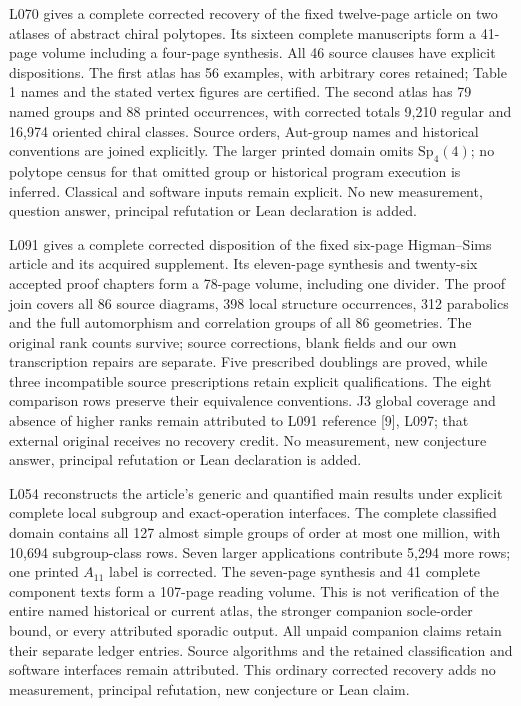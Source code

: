 \documentclass[11pt,a4paper]{article}
\begin{document}
L070 gives a complete corrected recovery of the fixed twelve-page article
on two atlases of abstract chiral polytopes. Its sixteen complete manuscripts
form a 41-page volume including a four-page synthesis. All 46 source clauses
have explicit dispositions. The first atlas has 56 examples, with arbitrary
cores retained; Table 1 names and the stated vertex figures are certified.
The second atlas has 79 named groups and 88 printed occurrences, with corrected
totals 9,210 regular and 16,974 oriented chiral classes. Source orders, Aut-group
names and historical conventions are joined explicitly. The larger printed
domain omits $\mathrm{Sp}_4(4)$; no polytope census for that omitted group or
historical program execution is inferred. Classical and software inputs
remain explicit. No new measurement, question answer, principal refutation
or Lean declaration is added.

L091 gives a complete corrected disposition of the fixed six-page
Higman--Sims article and its acquired supplement. Its eleven-page synthesis and
twenty-six accepted proof chapters form a 78-page volume, including one divider.
The proof join covers all 86 source diagrams, 398 local structure occurrences,
312 parabolics and the full automorphism and correlation groups of all 86
geometries. The original rank
counts survive; source corrections, blank fields and our own transcription
repairs are separate. Five prescribed doublings are proved, while three
incompatible source prescriptions retain explicit qualifications. The eight
comparison rows preserve their equivalence conventions. J3 global coverage
and absence of higher ranks remain attributed to L091 reference [9], L097;
that external original receives no recovery credit. No measurement, new
conjecture answer, principal refutation or Lean declaration is added.

L054 reconstructs the article's generic and quantified main results under
explicit complete local subgroup and exact-operation interfaces. The complete
classified domain contains all 127 almost simple groups of order at most one
million, with 10,694 subgroup-class rows. Seven larger applications contribute
5,294 more rows; one printed $A_{11}$ label is corrected. The seven-page
synthesis and 41 complete component texts form a 107-page reading volume.
This is not verification of the entire named historical or current atlas,
the stronger companion socle-order bound, or every attributed sporadic output.
All unpaid companion claims retain their separate ledger entries. Source
algorithms and the retained classification and software interfaces remain
attributed. This ordinary corrected recovery adds no measurement, principal
refutation, new conjecture or Lean claim.
\end{document}
